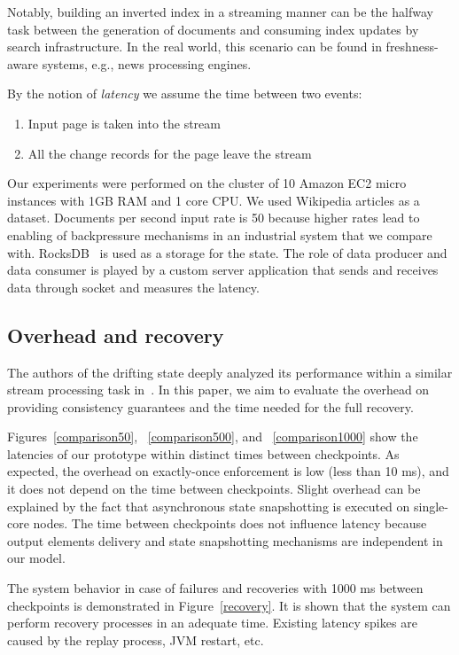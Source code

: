 Notably, building an inverted index in a streaming manner can be the halfway task between the generation of documents and consuming index updates by search infrastructure. In the real world, this scenario can be found in freshness-aware systems, e.g., news processing engines.

By the notion of {\it latency} we assume the time between two events: 

\begin{enumerate}
    \item Input page is taken into the stream
    \item All the change records for the page leave the stream
\end{enumerate}

Our experiments were performed on the cluster of 10 Amazon EC2 micro instances with 1GB RAM and 1 core CPU. We used Wikipedia articles as a dataset. Documents per second input rate is 50 because higher rates lead to enabling of backpressure mechanisms in an industrial system that we compare with. RocksDB~\cite{rocksdb} is used as a storage for the state. The role of data producer and data consumer is played by a custom server application that sends and receives data through socket and measures the latency.

\subsection{Overhead and recovery}
The authors of the drifting state deeply analyzed its performance within a similar stream processing task in~\cite{we2018seim}. In this paper, we aim to evaluate the overhead on providing consistency guarantees and the time needed for the full recovery.

Figures~\ref{comparison50}, ~\ref{comparison500}, and ~\ref{comparison1000} show the latencies of our prototype within distinct times between checkpoints. As expected, the overhead on exactly-once enforcement is low (less than 10 ms), and it does not depend on the time between checkpoints. Slight overhead can be explained by the fact that asynchronous state snapshotting is executed on single-core nodes. The time between checkpoints does not influence latency because output elements delivery and state snapshotting mechanisms are independent in our model.

The system behavior in case of failures and recoveries with 1000 ms between checkpoints is demonstrated in Figure~\ref{recovery}. It is shown that the system can perform recovery processes in an adequate time. Existing latency spikes are caused by the replay process, JVM restart, etc.

